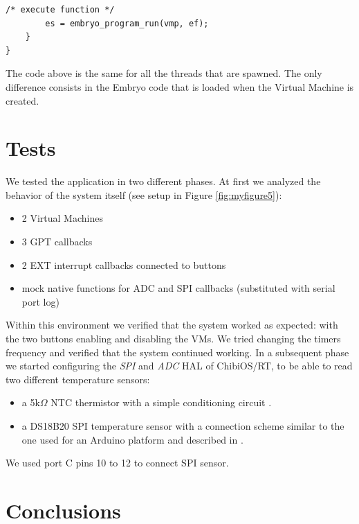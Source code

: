 \documentclass[a4paper,10pt]{article}
\begin{document}
\begin{multicols}{2}
\begin{lstlisting}[caption={Callback looking for a function in VMs}]
		/* execute function */
		es = embryo_program_run(vmp, ef);
	}
}
\end{lstlisting}\medskip

The code above is the same for all the threads that are spawned. The only difference consists in the Embryo code that is loaded when the Virtual Machine is created.

\section{Tests}

We tested the application in two different phases. At first we analyzed the behavior of the system itself (see setup in Figure \ref{fig:myfigure5}):

\begin{itemize}
\item 2 Virtual Machines
\item 3 GPT callbacks
\item 2 EXT interrupt callbacks connected to buttons
\item mock native functions for ADC and SPI callbacks (substituted with serial port log)
\end{itemize}

Within this environment we verified that the system worked as expected: with the two buttons enabling and disabling the VMs.\newline
We tried changing the timers frequency and verified that the system continued working.
In a subsequent phase we started configuring the \textit{SPI} and \textit{ADC} HAL of ChibiOS/RT, to be able to read two different temperature sensors:

\begin{itemize}
\item a 5k$ \Omega $ NTC thermistor \cite{wikiTh} with a simple conditioning circuit \cite{embTh}.
\item a DS18B20 SPI temperature sensor with a connection scheme similar to the one used for an Arduino platform and described in \cite{spiArd}.
\end{itemize}

We used port C pins 10 to 12 to connect SPI sensor.


\section{Conclusions}


\end{multicols}
\end{document}
